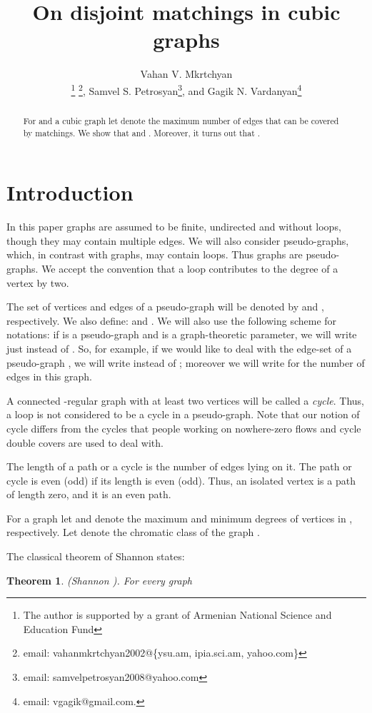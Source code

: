 \documentclass[fleqn,12pt,twoside]{article}
\title{On disjoint matchings in cubic graphs}
\author{Vahan V. Mkrtchyan\address[MCSD]{Department of Informatics and Applied Mathematics,\\
Yerevan State University, Yerevan, 0025, Armenia}\address{Institute for Informatics and Automation Problems,\\
National Academy of Sciences of Republic of Armenia, 0014, Armenia}
\thanks{The author is supported by a grant of Armenian National Science and
Education Fund}
\thanks{email: vahanmkrtchyan2002@\{ysu.am, ipia.sci.am,
yahoo.com\}},
        Samvel S. Petrosyan\addressmark[MCSD]\thanks{email: samvelpetrosyan2008@yahoo.com
},
                and
        Gagik N. Vardanyan\addressmark[MCSD]\thanks{email: vgagik@gmail.com.}}
\newtheorem{theorem}{Theorem}
\begin{document}
\maketitle

\begin{abstract}
For  and a cubic graph  let  denote the
maximum number of edges that can be covered by  matchings. We
show that 
and .
Moreover, it turns out that .
\end{abstract}



\section{Introduction}

In this paper graphs are assumed to be finite, undirected and without
loops, though they may contain multiple edges. We will also consider
pseudo-graphs, which, in contrast with graphs, may contain loops.
Thus graphs are pseudo-graphs. We accept the convention that a loop
contributes to the degree of a vertex by two.

The set of vertices and edges of a pseudo-graph  will be denoted
by  and , respectively. We also define:  and
. We will also use the following scheme for notations:
if  is a pseudo-graph and  is a graph-theoretic
parameter, we will write just  instead of . So, for
example, if we would like to deal with the edge-set of a
pseudo-graph , we will write  instead of
; moreover we will write  for the
number of edges in this graph.

A connected -regular graph with at least two vertices will be
called a \textit{cycle}. Thus, a loop is not considered to be a
cycle in a pseudo-graph. Note that our notion of cycle differs from
the cycles that people working on nowhere-zero flows and cycle
double covers are used to deal with.

The length of a path or a cycle is the number of edges lying on it.
The path or cycle is even (odd) if its length is even (odd). Thus,
an isolated vertex is a path of length zero, and it is an even path.

For a graph  let  and 
denote the maximum and minimum degrees of vertices in ,
respectively. Let  denote the
chromatic class of the graph .

The classical theorem of Shannon states:

\begin{theorem}
(Shannon \cite{Shannon}). For every graph 
\end{theorem}
\end{document}
